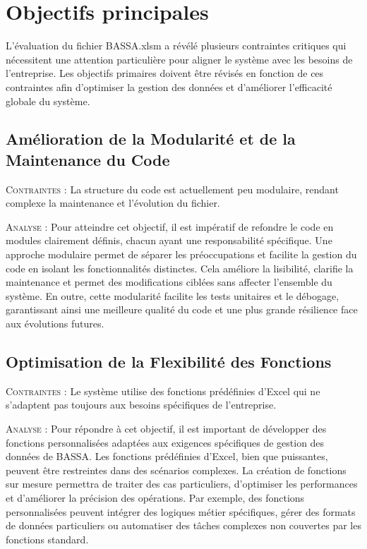 \documentclass[a4paper, oneside, 12pt, final]{extreport}
\begin{document}
\section{Objectifs principales}
L’évaluation du fichier BASSA.xlsm a révélé plusieurs contraintes critiques qui nécessitent une attention particulière pour aligner le système avec les besoins de l’entreprise. Les objectifs primaires doivent être révisés en fonction de ces contraintes afin d’optimiser la gestion des données et d’améliorer l’efficacité globale du système.

\subsection{Amélioration de la Modularité et de la Maintenance du Code}
\textsc{Contraintes} : La structure du code est actuellement peu modulaire, rendant complexe la maintenance et l'évolution du fichier.

\textsc{Analyse} : Pour atteindre cet objectif, il est impératif de refondre le code en modules clairement définis, chacun ayant une responsabilité spécifique. Une approche modulaire permet de séparer les préoccupations et facilite la gestion du code en isolant les fonctionnalités distinctes. Cela améliore la lisibilité, clarifie la maintenance et permet des modifications ciblées sans affecter l’ensemble du système. En outre, cette modularité facilite les tests unitaires et le débogage, garantissant ainsi une meilleure qualité du code et une plus grande résilience face aux évolutions futures.

\subsection{Optimisation de la Flexibilité des Fonctions}
\textsc{Contraintes} : Le système utilise des fonctions prédéfinies d'Excel qui ne s’adaptent pas toujours aux besoins spécifiques de l'entreprise.

\textsc{Analyse} : Pour répondre à cet objectif, il est important de développer des fonctions personnalisées adaptées aux exigences spécifiques de gestion des données de BASSA. Les fonctions prédéfinies d'Excel, bien que puissantes, peuvent être restreintes dans des scénarios complexes. La création de fonctions sur mesure permettra de traiter des cas particuliers, d’optimiser les performances et d’améliorer la précision des opérations. Par exemple, des fonctions personnalisées peuvent intégrer des logiques métier spécifiques, gérer des formats de données particuliers ou automatiser des tâches complexes non couvertes par les fonctions standard.
\end{document}
